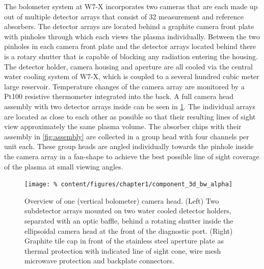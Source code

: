%
            The bolometer system at W7-X incorporates two cameras that are each made up out of multiple detector arrays that consist of 32 measurement and reference absorbers. The detector arrays are located behind a graphite camera front plate with pinholes through which each views the plasma individually. Between the two pinholes in each camera front plate and the detector arrays located behind there is a rotary shutter that is capable of blocking any radiation entering the housing. The detector holder, camera housing and aperture are all cooled via the central water cooling system of W7-X, which is coupled to a several hundred cubic meter large reservoir. Temperature changes of the camera array are monitored by a Pt100 resistive thermometer integrated into the back. A full camera head assembly with two detector arrays inside can be seen in \cref{fig:component_3D}. The individual arrays are located as close to each other as possible so that their resulting lines of sight view approximately the same plasma volume. The absorber chips with their assembly in \cref{fig:assembly} are collected in a group head with four channels per unit each. These group heads are angled individually towards the pinhole inside the camera array in a fan-shape to achieve the best possible line of sight coverage of the plasma at small viewing angles.\\%
%
            \begin{figure}[t]%
                \centering%
                \texttt{[image: \%
                    content/figures/chapter1/component\_3d\_bw\_alpha]}%
                \caption{%
                    Overview of one (vertical bolometer) camera head. (Left) Two subdetector arrays mounted on two water cooled detector holders, separated with an optic baffle, behind a rotating shutter inside the ellipsoidal camera head at the front of the diagnostic port. (Right) Graphite tile cap in front of the stainless steel aperture plate as thermal protection with indicated line of sight cone, wire mesh microwave protection and backplate connectors.}\label{fig:component_3D}%
            \end{figure}%
%
